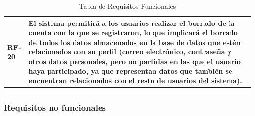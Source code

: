 \documentclass{article}
\begin{document}
\begin{center}
\begin{longtable}{ | p{} | p{} | }
        \hline
        RF-20 & El sistema permitirá a los usuarios realizar el borrado de la cuenta con la que se registraron, lo que implicará el borrado de todos los datos almacenados en la base de datos que estén relacionados con su perfil (correo electrónico, contraseña y otros datos personales, 
        pero no partidas en las que el usuario haya participado, ya que representan datos que también se encuentran relacionados con el resto de usuarios del sistema). \\
        \hline
        \caption{Tabla de Requisitos Funcionales}
    \end{longtable}
\end{center}

\subsubsection{Requisitos no funcionales} %
\end{document}

